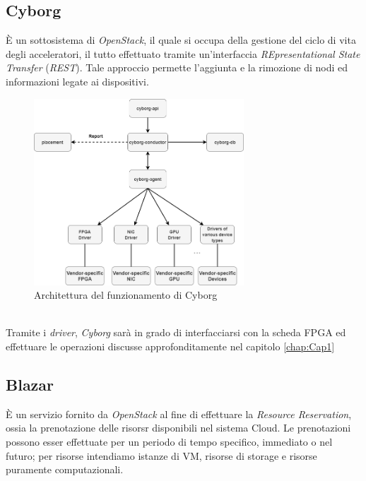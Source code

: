 \subsection{Cyborg}
È un sottosistema di \textit{OpenStack}, il quale si occupa della gestione del ciclo di vita degli acceleratori, il tutto effettuato tramite un'interfaccia \textit{REpresentational State Transfer} (\textit{REST}). Tale approccio permette l'aggiunta e la rimozione di nodi ed informazioni legate ai dispositivi.\cite{Cyborg}
\begin{figure}[h]
\centering
\includegraphics[width=0.7\textwidth]{images/cyborg-architecture.png}
\caption{Architettura del funzionamento di Cyborg\cite{Cyborg}}
\end{figure}\\
Tramite i \textit{driver}, \textit{Cyborg} sarà in grado di interfacciarsi con la scheda FPGA ed effettuare le operazioni discusse approfonditamente nel capitolo \ref{chap:Cap1}
\subsection{Blazar}
\label{Blazar}
È un servizio fornito da \textit{OpenStack} al fine di effettuare la \textit{Resource Reservation}, ossia la prenotazione delle risorsr disponibili nel sistema Cloud. Le prenotazioni possono esser effettuate per un periodo di tempo specifico, immediato o nel futuro; per risorse intendiamo istanze di VM, risorse di storage e risorse puramente computazionali.\cite{Blazar}
